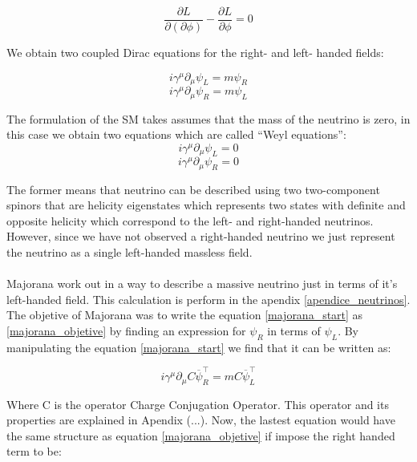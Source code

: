 \begin{equation}
\frac{\partial L}{\partial (\partial \phi)} - \frac{\partial L}{\partial \phi} = 0
\end{equation}

We obtain two coupled Dirac equations for the right- and left- handed fields:

\begin{equation}\label{majorana_objetive}
i \gamma ^\mu \partial_\mu \psi_L = m \psi_R
\end{equation} 
\begin{equation}\label{majorana_start}
i \gamma ^\mu \partial_\mu \psi_R = m \psi_L
\end{equation} 

The formulation of the SM takes assumes that the mass of the neutrino is zero, in this case we obtain two equations which are called ``Weyl equations'':
\begin{equation}
i \gamma ^\mu \partial_\mu \psi_L = 0
\end{equation}
\begin{equation}
i \gamma ^\mu \partial_\mu \psi_R = 0
\end{equation}

The former means that neutrino can be described using two two-component spinors that are helicity eigenstates which represents two states with definite and opposite helicity which correspond to the left- and right-handed neutrinos. However, since we have not observed a right-handed neutrino we just represent the neutrino as a single left-handed massless field.  \\
\\
Majorana work out in a way to describe a massive neutrino just in terms of it's left-handed field.
This calculation is perform in the apendix \ref{apendice_neutrinos}. The objetive of Majorana was to write the equation \ref{majorana_start} as \ref{majorana_objetive} by finding an expression for $\psi_R$ in terms of $\psi_L$. By manipulating the equation \ref{majorana_start} we find that it can be written as:  

\begin{equation}
i \gamma^\mu \partial_\mu C \overline{\psi}^\intercal_R = m C \overline{\psi}^{\intercal}_L
\end{equation}

Where C is the operator Charge Conjugation Operator. This operator and its properties are explained in Apendix (...). Now, the lastest equation would have the same structure as equation \ref{majorana_objetive} if impose the right handed term to be:

